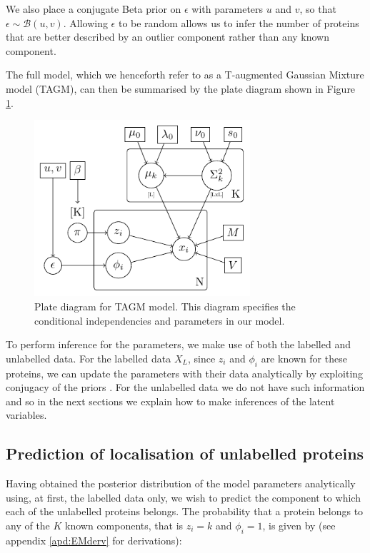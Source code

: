 \documentclass[12pt,english]{article}\usepackage[]{graphicx}\usepackage[]{color}
\begin{document}
We also place a conjugate Beta prior on $\epsilon$ with parameters $u$
and $v$, so that $\epsilon \sim \mathcal{B}(u,v)$.  Allowing
$\epsilon$ to be random allows us to infer the number of proteins that
are better described by an outlier component rather than any known
component.

The full model, which we henceforth refer to as a T-augmented Gaussian
Mixture model (TAGM), can then be summarised by the plate diagram
shown in Figure \ref{plateDiagram}.

\begin{figure}[H]
  \includegraphics[width=8cm]{graphmodel2.pdf}
  \centering
  \caption{Plate diagram for TAGM model. This diagram specifies the
    conditional independencies and parameters in our
    model.}\label{plateDiagram}
\end{figure}

To perform inference for the parameters, we make use of both the
labelled and unlabelled data. For the labelled data $X_L$, since $z_i$
and $\phi_i$ are known for these proteins, we can update the
parameters with their data analytically by exploiting conjugacy of the
priors \citep[see, for example,][]{Gelman:1995}. For the unlabelled
data we do not have such information and so in the next sections we
explain how to make inferences of the latent variables.

\subsection*{Prediction of localisation of unlabelled proteins}

Having obtained the posterior distribution of the model parameters
analytically using, at first, the labelled data only, we wish to
predict the component to which each of the unlabelled proteins
belongs. The probability that a protein belongs to any of the $K$
known components, that is $z_i = k$ and $\phi_i = 1$, is given by (see
appendix \ref{apd:EMderv} for derivations):
\end{document}
